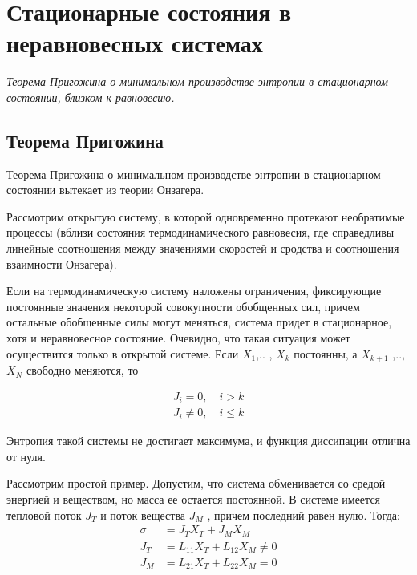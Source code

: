 \documentclass[12pt,a4paper,oneside]{book}
\begin{document}
\section{Стационарные состояния в неравновесных системах}
{\it Теорема Пригожина о минимальном производстве энтропии в стационарном состоянии, близком к равновесию.}

\subsection{Теорема Пригожина}

Теорема Пригожина о минимальном производстве энтропии в стационарном состоянии вытекает из теории Онзагера.

Рассмотрим открытую систему, в которой одновременно протекают необратимые процессы (вблизи состояния термодинамического равновесия, где справедливы линейные соотношения между значениями скоростей и сродства и соотношения взаимности Онзагера).


Если на термодинамическую систему наложены ограничения, фиксирующие постоянные значения некоторой совокупности обобщенных сил, причем остальные обобщенные силы могут меняться, система придет в стационарное,  хотя и неравновесное состояние. Очевидно, что такая ситуация может осуществится только в открытой системе.  Если $X_1$,.. , $X_k$ постоянны, а $X_{k+1}$ ,.., $X_N$  свободно меняются, то     

\begin{align}
	J_i = 0,\quad i > k  \\ \nonumber
	J_i \neq 0, \quad i\leq k \nonumber
\end{align}

Энтропия такой системы не достигает максимума, и функция диссипации отлична от нуля. 

Рассмотрим простой пример. Допустим, что система обменивается со средой энергией и  веществом, но масса ее остается постоянной. В системе имеется тепловой поток $J_T$  и поток вещества $J_M$ , причем последний равен нулю. Тогда:
\begin{align}
		\sigma & = J_T X_T + J_M X_M  \\ \nonumber
		J_T & = L_{11}X_T + L_{12}X_M \neq 0 \\ \nonumber
		J_M & = L_{21}X_T + L_{22}X_M = 0   \nonumber
\end{align}
\end{document}
